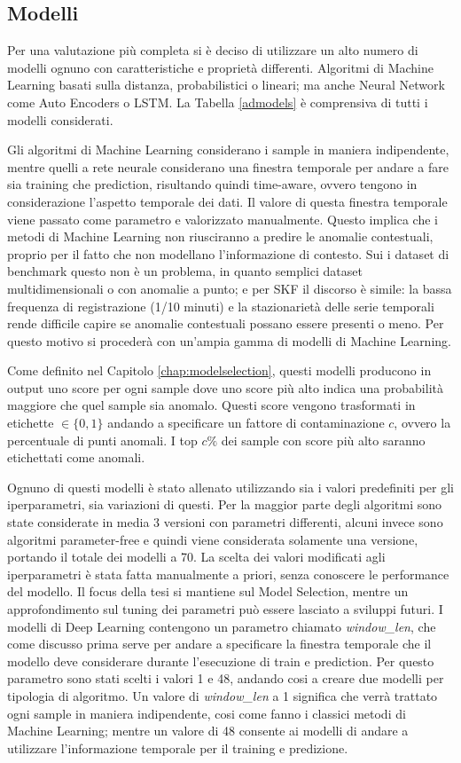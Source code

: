 \subsection{Modelli}
Per una valutazione più completa si è deciso di utilizzare un alto numero di modelli ognuno con caratteristiche e proprietà differenti. Algoritmi di Machine Learning basati sulla distanza, probabilistici o lineari; ma anche Neural Network come Auto Encoders o LSTM. La Tabella \ref{admodels} è comprensiva di tutti i modelli considerati.

Gli algoritmi di Machine Learning considerano i sample in maniera indipendente, mentre quelli a rete neurale considerano una finestra temporale per andare a fare sia training che prediction, risultando quindi time-aware, ovvero tengono in considerazione l'aspetto temporale dei dati. Il valore di questa finestra temporale viene passato come parametro e valorizzato manualmente.
Questo implica che i metodi di Machine Learning non riusciranno a predire le anomalie contestuali, proprio per il fatto che non modellano l'informazione di contesto. 
Sui i dataset di benchmark questo non è un problema, in quanto semplici dataset multidimensionali o con anomalie a punto; e per SKF il discorso è simile: la bassa frequenza di registrazione (1/10 minuti) e la stazionarietà delle serie temporali rende difficile capire se anomalie contestuali possano essere presenti o meno. Per questo motivo si procederà con un'ampia gamma di modelli di Machine Learning.


Come definito nel Capitolo \ref{chap:modelselection}, questi modelli producono in output uno score per ogni sample dove uno score più alto indica una probabilità maggiore che quel sample sia anomalo. Questi score vengono trasformati in etichette \(\in \{0,1\}\) andando a specificare un fattore di contaminazione $c$, ovvero la percentuale di punti anomali. I top $c\%$ dei sample con score più alto saranno etichettati come anomali. 

Ognuno di questi modelli è stato allenato utilizzando sia i valori predefiniti per gli iperparametri, sia variazioni di questi. 
Per la maggior parte degli algoritmi sono state considerate in media 3 versioni con parametri differenti, alcuni invece sono algoritmi parameter-free e quindi viene considerata solamente una versione, portando il totale dei modelli a 70.
La scelta dei valori modificati agli iperparametri è stata fatta manualmente a priori, senza conoscere le performance del modello. Il focus della tesi si mantiene sul Model Selection, mentre un approfondimento sul tuning dei parametri può essere lasciato a sviluppi futuri.
I modelli di Deep Learning contengono un parametro chiamato \textit{window\_len}, che come discusso prima serve per andare a specificare la finestra temporale che il modello deve considerare durante l'esecuzione di train e prediction. Per questo parametro sono stati scelti i valori 1 e 48, andando cosi a creare due modelli per tipologia di algoritmo. 
Un valore di \textit{window\_len} a 1 significa che verrà trattato ogni sample in maniera indipendente, cosi come fanno i classici metodi di Machine Learning; mentre un valore di 48 consente ai modelli di andare a utilizzare l'informazione temporale per il training e predizione.

